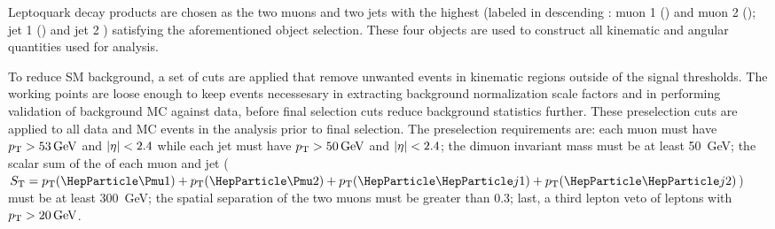 Leptoquark decay products are chosen as the two muons and two jets with the highest \pt (labeled in descending \pt: muon 1 (\PmuOne) and muon 2 (\PmuTwo); jet 1 (\PjOne) and jet 2 \PjTwo) satisfying the aforementioned object selection. These four objects are used to construct all kinematic and angular quantities used for analysis. 

To reduce SM background, a set of cuts are applied that remove unwanted events in kinematic regions outside of the signal thresholds. The working points are loose enough to keep events necessesary in extracting background normalization scale factors and in performing validation of background MC against data, before final selection cuts reduce background statistics further. These preselection cuts are applied to all data and MC events in the analysis prior to final selection. The preselection requirements are: each muon must have $\pt > \SI{53}{\GeV}$ and $\lvert \eta \rvert < 2.4$ while each jet must have $\pt > \SI{50}{\GeV}$ and $\lvert \eta \rvert< 2.4$; the dimuon invariant mass \Muu must be at least \SI{50}{\GeV}; the scalar sum of the \pt of each muon and jet ($\ST = \pt(\PmuOne) + \pt(\PmuTwo) + \pt(\PjOne) + \pt(\PjTwo)$) must be at least \SI{300}{\GeV}; the spatial separation \DR of the two muons must be greater than 0.3; last, a third lepton veto of leptons with $\pt > \SI{20}{\GeV}$.